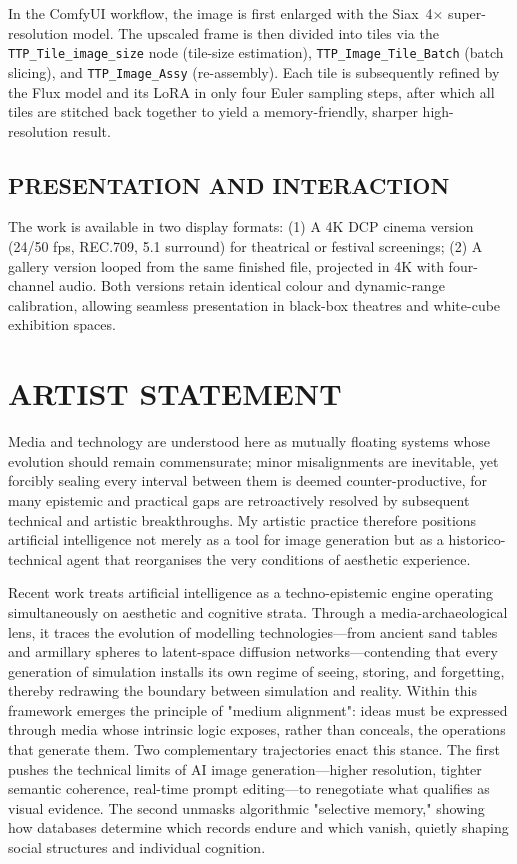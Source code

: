 \documentclass[sigconf,authordraft]{acmart}
\begin{document}
In the ComfyUI workflow, the image is first enlarged with the Siax~4$\times$ super-resolution model. The upscaled frame is then divided into tiles via the \texttt{TTP\_Tile\_image\_size} node (tile-size estimation), \texttt{TTP\_Image\_Tile\_Batch} (batch slicing), and \texttt{TTP\_Image\_Assy} (re-assembly). Each tile is subsequently refined by the Flux model and its LoRA in only four Euler sampling steps, after which all tiles are stitched back together to yield a memory-friendly, sharper high-resolution result.

\subsection{PRESENTATION AND INTERACTION}
The work is available in two display formats:  
(1) A 4K DCP cinema version (24/50 fps, REC.709, 5.1 surround) for theatrical or festival screenings;  
(2) A gallery version looped from the same finished file, projected in 4K with four-channel audio. Both versions retain identical colour and dynamic-range calibration, allowing seamless presentation in black-box theatres and white-cube exhibition spaces.

\section{ARTIST STATEMENT}
Media and technology are understood here as mutually floating systems whose evolution should remain commensurate; minor misalignments are inevitable, yet forcibly sealing every interval between them is deemed counter-productive, for many epistemic and practical gaps are retroactively resolved by subsequent technical and artistic breakthroughs.  My artistic practice therefore positions artificial intelligence not merely as a tool for image generation but as a historico-technical agent that reorganises the very conditions of aesthetic experience.

Recent work treats artificial intelligence as a techno-epistemic engine operating simultaneously on aesthetic and cognitive strata. Through a media-archaeological lens, it traces the evolution of modelling technologies—from ancient sand tables and armillary spheres to latent-space diffusion networks—contending that every generation of simulation installs its own regime of seeing, storing, and forgetting, thereby redrawing the boundary between simulation and reality. Within this framework emerges the principle of "medium alignment": ideas must be expressed through media whose intrinsic logic exposes, rather than conceals, the operations that generate them.
Two complementary trajectories enact this stance. The first pushes the technical limits of AI image generation—higher resolution, tighter semantic coherence, real-time prompt editing—to renegotiate what qualifies as visual evidence. The second unmasks algorithmic "selective memory," showing how databases determine which records endure and which vanish, quietly shaping social structures and individual cognition.
\end{document}
